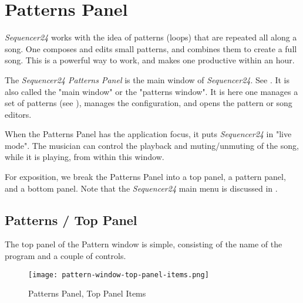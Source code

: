%
%
%

\section{Patterns Panel}
\label{sec:seq24_patterns_panel}

   \textsl{Sequencer24} works with the idea of patterns (loops) that are
   repeated all along a song.  One composes and edits small patterns, and
   combines them to create a full song.  This is a powerful way to work, and
   makes one productive within an hour.

   The \textsl{Sequencer24 Patterns Panel} is the main window of
   \textsl{Sequencer24}.
   See .
   It is also called the "main window" or the "patterns window".
   It is here one manages a set of patterns
   (see ),
   manages the configuration, and opens the pattern or song editors.

   When the Patterns Panel has the application focus, it puts
   \textsl{Sequencer24} in "live mode".  The musician can
   control the playback and muting/unmuting of the song, while it is
   playing, from within this window.

   For exposition, we break the Patterns Panel
   into a top panel, a pattern panel, and a
   bottom panel.  Note that the \textsl{Sequencer24} main menu is discussed in
   .

\subsection{Patterns / Top Panel}
\label{subsec:seq24_patterns_panel_top}

   The top panel of the Pattern window is simple, consisting of the name of
   the program and a couple of controls.

\begin{figure}[H]
   \centering 
   \texttt{[image: pattern-window-top-panel-items.png]}
   \caption{Patterns Panel, Top Panel Items}
   \label{fig:pattern_window_top_panel_items}
\end{figure}

